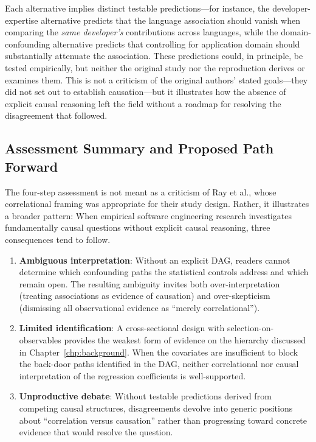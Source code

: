 Each alternative implies distinct testable predictions---for instance, the developer-expertise alternative predicts that the language association should vanish when comparing the \emph{same developer's} contributions across languages, while the domain-confounding alternative predicts that controlling for application domain should substantially attenuate the association.
These predictions could, in principle, be tested empirically, but neither the original study nor the reproduction derives or examines them.
This is not a criticism of the original authors' stated goals---they did not set out to establish causation---but it illustrates how the absence of explicit causal reasoning left the field without a roadmap for resolving the disagreement that followed.

\subsection{Assessment Summary and Proposed Path Forward}

The four-step assessment is not meant as a criticism of Ray et al., whose correlational framing was appropriate for their study design.
Rather, it illustrates a broader pattern: When empirical software engineering research investigates fundamentally causal questions without explicit causal reasoning, three consequences tend to follow.
\begin{enumerate}[leftmargin=15pt]
    \item \textbf{Ambiguous interpretation}: Without an explicit DAG, readers cannot determine which confounding paths the statistical controls address and which remain open. The resulting ambiguity invites both over-interpretation (treating associations as evidence of causation) and over-skepticism (dismissing all observational evidence as ``merely correlational'').
    \item \textbf{Limited identification}: A cross-sectional design with selection-on-observables provides the weakest form of evidence on the hierarchy discussed in Chapter~\ref{chp:background}. When the covariates are insufficient to block the back-door paths identified in the DAG, neither correlational nor causal interpretation of the regression coefficients is well-supported.
    \item \textbf{Unproductive debate}: Without testable predictions derived from competing causal structures, disagreements devolve into generic positions about ``correlation versus causation'' rather than progressing toward concrete evidence that would resolve the question.
\end{enumerate}

